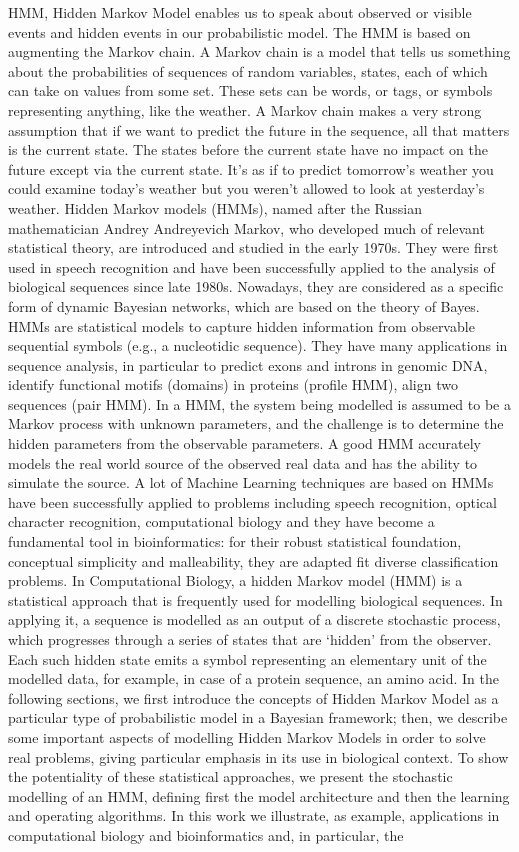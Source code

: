 \documentclass{article}
\begin{document}
HMM, Hidden Markov Model enables us to speak about observed or visible events and hidden events in our probabilistic model.
The HMM is based on augmenting the Markov chain. A Markov chain is a model that tells us something about the probabilities of sequences of random variables, states, each of which can take on values from some set. These sets can be words, or tags, or symbols representing anything, like the weather. A Markov chain makes a very strong assumption that if we want to predict the future in the sequence, all that matters is the current state. The states before the current state have no impact on the future except via the current state. It’s as if to predict tomorrow’s weather you could examine today’s weather but you weren’t allowed to look at yesterday’s weather. Hidden Markov models (HMMs), named after the Russian mathematician Andrey Andreyevich Markov, who developed much of relevant statistical theory, are introduced and studied in the early 1970s. They were first used in speech recognition and have been successfully applied to the analysis of biological sequences since late 1980s. Nowadays, they are considered as a specific form of dynamic Bayesian networks, which are based on the theory of Bayes. HMMs are statistical models to capture hidden information from observable sequential symbols (e.g., a nucleotidic sequence). They have many applications in sequence analysis, in particular to predict exons and introns in genomic DNA, identify functional motifs (domains) in proteins (profile HMM), align two sequences (pair HMM). In a HMM, the system being modelled is assumed to be a Markov process with unknown parameters, and the challenge is to determine the hidden parameters from the observable parameters. A good HMM accurately models the real world source of the observed real data and has the ability to simulate the source. A lot of Machine Learning techniques are based on HMMs have been successfully applied to problems including speech recognition, optical character recognition, computational biology and they have become a fundamental tool in bioinformatics: for their robust statistical foundation, conceptual simplicity and malleability, they are adapted fit diverse classification problems. In Computational Biology, a hidden Markov model (HMM) is a statistical approach that is frequently used for modelling biological sequences. In applying it, a sequence is modelled as an output of a discrete stochastic process, which progresses through a series of states that are ‘hidden’ from the observer. Each such hidden state emits a symbol representing an elementary unit of the modelled data, for example, in case of a protein sequence, an amino acid. In the following sections, we first introduce the concepts of Hidden Markov Model as a particular type of probabilistic model in a Bayesian framework; then, we describe some important aspects of modelling Hidden Markov Models in order to solve real problems, giving particular emphasis in its use in biological context. To show the potentiality of these statistical approaches, we present the stochastic modelling of an HMM, defining first the model architecture and then the learning and operating algorithms. In this work we illustrate, as example, applications in computational biology and bioinformatics and, in particular, the 
\end{document}
